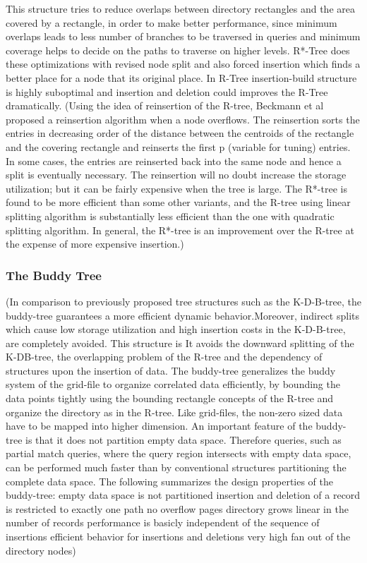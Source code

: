 \documentclass[a4paper,12pt]{article}
\begin{document}
This structure tries to reduce overlaps between directory rectangles and the area covered by a rectangle, in order to make better performance, since minimum overlaps leads to less number of branches to be traversed in queries and minimum coverage helps to decide on the paths to traverse on higher levels. 
R*-Tree does these optimizations with revised node split and also forced insertion which finds a better place for a node that its original place. In R-Tree insertion-build structure is highly suboptimal and insertion and deletion could improves the R-Tree dramatically.
 (Using the idea of reinsertion of the R-tree, Beckmann et al proposed a reinsertion algorithm when a node overflows. The reinsertion sorts the entries in decreasing order of the distance between the centroids of the rectangle and the covering rectangle and reinserts the first p (variable for tuning) entries. In some cases, the entries are reinserted back into the same node and hence a split is eventually necessary. The reinsertion will no doubt increase the storage utilization; but it can be fairly expensive when the tree is large. The R*-tree is found to be more efficient than some other variants, and the R-tree using linear splitting algorithm is substantially less efficient than the one with quadratic splitting algorithm. In general, the R*-tree is an improvement over the R-tree at the expense of more expensive insertion.)

\subsubsection{The Buddy Tree}
(In comparison to previously proposed tree structures such as the K-D-B-tree, the buddy-tree guarantees a more efficient dynamic behavior.Moreover, indirect splits which cause low storage utilization and high insertion costs in the K-D-B-tree, are completely avoided. This structure is 
It avoids the downward splitting of the K-DB-tree, the overlapping problem of the R-tree and the dependency of structures upon the insertion of data. The buddy-tree generalizes the buddy system of the grid-file to organize correlated data efficiently, by bounding the data points tightly using the bounding rectangle concepts of the R-tree and organize the directory as in the R-tree. Like grid-files, the non-zero sized data have to be mapped into higher dimension.
An important feature of the buddy-tree is that it does not partition empty data space. Therefore queries, such as partial match queries, where the query region intersects with empty data space, can be performed much faster than by conventional structures partitioning the complete data space.
The following summarizes the design properties of the buddy-tree:
empty data space is not partitioned
insertion and deletion of a record is restricted to
exactly one path
no overflow pages
directory grows linear in the number of records
performance is basicly independent of the sequence of
insertions
efficient behavior for insertions and deletions
very high fan out of the directory nodes)
\end{document}
